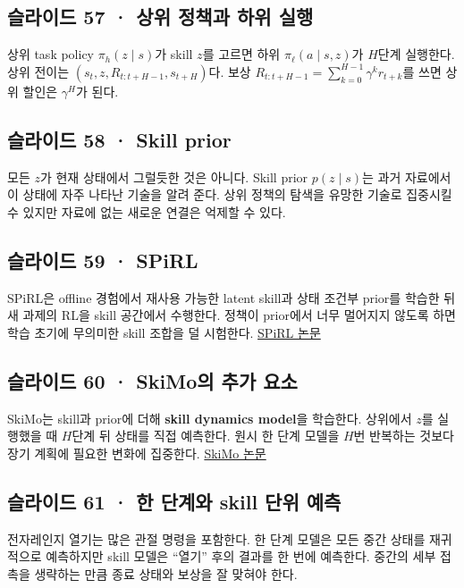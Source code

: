 \documentclass[11pt,a4paper]{article}
\begin{document}
\subsection{슬라이드 57 · 상위 정책과 하위 실행}

상위 task policy $\pi_h(z\mid s)$가 skill $z$를 고르면 하위 $\pi_\ell(a\mid s,z)$가 $H$단계 실행한다. 상위 전이는 $(s_t,z,R_{t:t+H-1},s_{t+H})$다. 보상 $R_{t:t+H-1}=\sum_{k=0}^{H-1}\gamma^k r_{t+k}$를 쓰면 상위 할인은 $\gamma^H$가 된다.\par

\subsection{슬라이드 58 · Skill prior}

모든 $z$가 현재 상태에서 그럴듯한 것은 아니다. Skill prior $p(z\mid s)$는 과거 자료에서 이 상태에 자주 나타난 기술을 알려 준다. 상위 정책의 탐색을 유망한 기술로 집중시킬 수 있지만 자료에 없는 새로운 연결은 억제할 수 있다.\par

\subsection{슬라이드 59 · SPiRL}

SPiRL은 offline 경험에서 재사용 가능한 latent skill과 상태 조건부 prior를 학습한 뒤 새 과제의 RL을 skill 공간에서 수행한다. 정책이 prior에서 너무 멀어지지 않도록 하면 학습 초기에 무의미한 skill 조합을 덜 시험한다. \href{https://arxiv.org/abs/2010.11944}{SPiRL 논문}\par

\subsection{슬라이드 60 · SkiMo의 추가 요소}

SkiMo는 skill과 prior에 더해 \textbf{skill dynamics model}을 학습한다. 상위에서 $z$를 실행했을 때 $H$단계 뒤 상태를 직접 예측한다. 원시 한 단계 모델을 $H$번 반복하는 것보다 장기 계획에 필요한 변화에 집중한다. \href{https://arxiv.org/abs/2207.07560}{SkiMo 논문}\par

\subsection{슬라이드 61 · 한 단계와 skill 단위 예측}

전자레인지 열기는 많은 관절 명령을 포함한다. 한 단계 모델은 모든 중간 상태를 재귀적으로 예측하지만 skill 모델은 “열기” 후의 결과를 한 번에 예측한다. 중간의 세부 접촉을 생략하는 만큼 종료 상태와 보상을 잘 맞혀야 한다.\par
\end{document}
